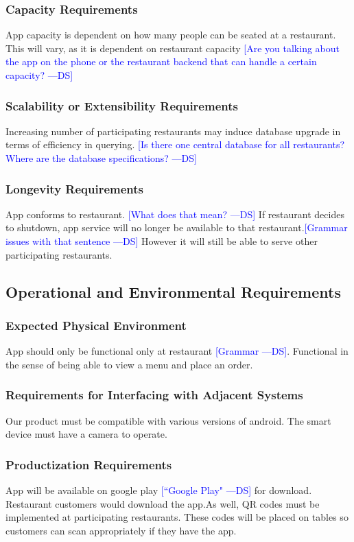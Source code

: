\documentclass[12pt, titlepage]{article}
\newcommand{\authornote}[3]{\textcolor{#1}{[#3 ---#2]}}
\newcommand{\authornote}[3]{}
\newcommand{\ds}[1]{\authornote{blue}{DS}{#1}}
\begin{document}
\subsubsection{Capacity Requirements}
App capacity is dependent on how many people can be seated at a restaurant. This will vary, as it is dependent on restaurant capacity
\ds{Are you talking about the app on the phone or the restaurant backend that can handle a certain capacity?}
\subsubsection{Scalability or Extensibility Requirements}
Increasing number of participating restaurants may induce database upgrade in terms of efficiency in querying.   
\ds{Is there one central database for all restaurants?
Where are the database specifications?}

\subsubsection{Longevity Requirements}
App conforms to restaurant. \ds{What does that mean?} If restaurant decides to shutdown, app service will no longer be available to that restaurant.\ds{Grammar issues with that sentence} However it will still be able to serve other participating restaurants.

\subsection{Operational and Environmental Requirements}
\subsubsection{Expected Physical Environment}
App should only be functional only at restaurant \ds{Grammar}. Functional in the sense of being able to view a menu and place an order.
\subsubsection{Requirements for Interfacing with Adjacent Systems}
Our product must be compatible with various versions of android. The smart device must have a camera to operate.
\subsubsection{Productization Requirements}
App will be available on google play \ds{``Google Play"}
for download. Restaurant customers would download the app.As well, QR codes must be implemented at participating restaurants. These codes will be placed on tables so customers can scan appropriately if they have the app. 
\end{document}
